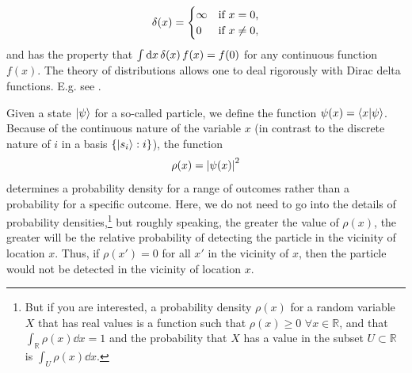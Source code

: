 {\begin{equation}
    \var(x)=
    \begin{cases} \infty & \text{if $x=0$,} \\
    0 & \text{if $x\neq 0$},
    \end{cases}
    \end{equation} and has the property that 
    $\int \dd x \var(x) f(x) = f(0)$ for any continuous function $f(x)$. The theory of distributions allows one to deal rigorously with Dirac delta functions. E.g. see \cite[ch. 6]{Rudin}.  
    }
    
     Given a state $\ket{\psi}$ for a so-called particle, we define the function $\psi(x)=\ip{x}{\psi}$. Because of the continuous nature of the variable $x$ (in contrast to the discrete nature of $i$ in a basis $\{\ket{s_i}:i\}$), the function 
     \begin{equation}\label{rhodensity}
     \rho(x)=\abs{\psi(x)}^2
     \end{equation} 
     determines a probability density for a range of outcomes rather than a probability for a specific outcome. Here, we do not need to go into the details of probability densities,\footnote{But if you are interested, a probability density $\rho(x)$ for a random variable $X$ that has real values is a function such that $\rho(x)\geq 0\, \,\forall x\in\mathbb{R}$, and that $\int_\mathbb{R} \rho(x) \dd x =1$ and the probability that $X$ has a value in the subset $U\subset\mathbb{R}$ is $\int_U \rho(x) \dd x $. } but roughly speaking, the greater the value of $\rho(x)$, the greater will be the relative probability of detecting the particle in the vicinity of location $x$. Thus, if $\rho(x')=0$ for all $x'$ in the vicinity of $x$, then the particle would not be detected in the vicinity of location $x$. 
    
